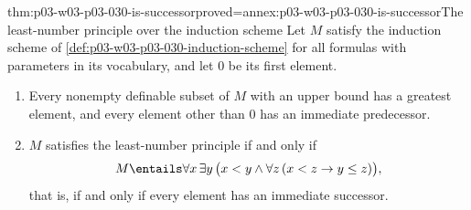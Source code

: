 \begin{hblemma}{thm:p03-w03-p03-030-is-successor}{proved=annex:p03-w03-p03-030-is-successor}{The least-number principle over the induction scheme}
Let \(M\) satisfy the induction scheme of
\cref{def:p03-w03-p03-030-induction-scheme} for all formulas with parameters
in its vocabulary, and let \(0\) be its first element.
\begin{enumerate}
\item Every nonempty definable subset of \(M\) with an upper bound has a
  greatest element, and every element other than \(0\) has an immediate
  predecessor.
\item \(M\) satisfies the least-number principle if and only if
  \[
   M\entails\forall x\,\exists y\,\bigl(x<y\wedge\forall z\,(x<z\rightarrow
   y\le z)\bigr),
  \]
  that is, if and only if every element has an immediate successor.
\end{enumerate}
\end{hblemma}

